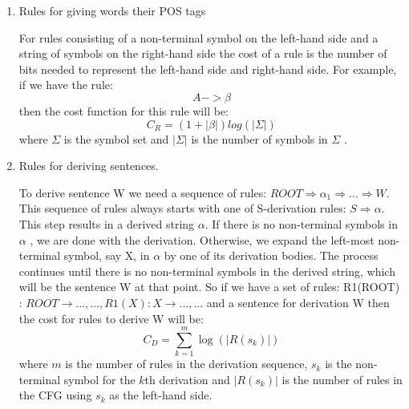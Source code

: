 \documentclass[paper=a4, fontsize=11pt]{scrartcl} %
\numberwithin{equation}{section} %
\numberwithin{figure}{section} %
\numberwithin{table}{section} %
\begin{document}
\begin{enumerate}[1.]
\item Rules for giving words their POS tags

For rules consisting of a non-terminal symbol on the left-hand side and a string of symbols on the right-hand side the cost of a rule is the number of bits needed to represent the left-hand side and right-hand side. For example, if we have the rule:
\begin{equation}\label{first}
A  -> \beta
\end{equation}
then the cost function for this rule will be:
\begin{equation}\label{first}
C_R = (1+\lvert\beta\rvert)log(\lvert\Sigma\rvert)
\end{equation}
where \begin{math} \Sigma \end{math}  is the symbol set and \begin{math} \lvert\Sigma\rvert \end{math} is the number of symbols in \begin{math} \Sigma \end{math} .
\item Rules for deriving sentences.

To derive sentence W we need a sequence of rules: \begin{math} ROOT \Rightarrow \alpha_1 \Rightarrow ... \Rightarrow W \end{math}. This sequence of rules always starts with one of S-derivation rules: \begin{math} S \Rightarrow \alpha \end{math}. This step results in a derived string \begin{math} \alpha \end{math}. If there is no non-terminal symbols in \begin{math} \alpha \end{math} , we are done with the derivation. Otherwise, we expand the left-most non-terminal symbol, say X, in \begin{math} \alpha \end{math} by one of its derivation bodies. The process continues until there is no non-terminal symbols in the derived string, which will be the sentence W at that point.
So if we have a set of rules: R1(ROOT) : $ROOT \rightarrow ... , ... , R1(X) : X \rightarrow ... , ...$ and a sentence for derivation W then the cost for rules to derive W will be:
\begin{equation}\label{first}
C_D = \sum \limits_{k=1}^m \log(\lvert R(s_k)\rvert)
\end{equation}
where $m$ is the number of rules in the derivation sequence, \begin{math} s_k \end{math} is the non-terminal symbol for the $k$th derivation and \begin{math} \lvert R(s_k)\rvert \end{math} is the number of rules in the CFG using \begin{math} s_k \end{math} as the left-hand side.
\end{enumerate}
\end{document}
